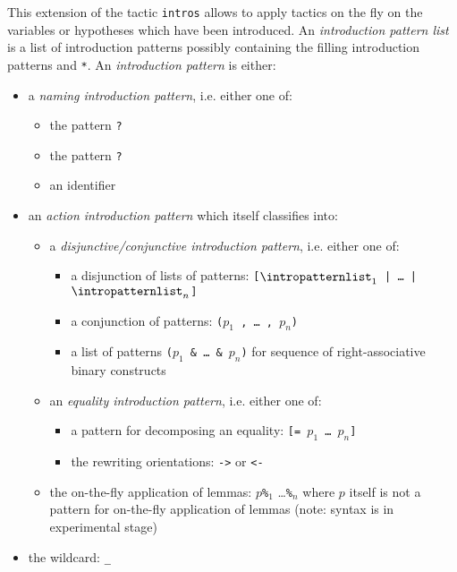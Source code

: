 This extension of the tactic {\tt intros} allows to apply tactics on
the fly on the variables or hypotheses which have been introduced. An
{\em introduction pattern list} {\intropatternlist} is a list of
introduction patterns possibly containing the filling introduction
patterns {\tt *} and {\tt **}. An {\em introduction pattern} is
either:
\begin{itemize}
\item a {\em naming introduction pattern}, i.e. either one of:
  \begin{itemize}
  \item the pattern \texttt{?}
  \item the pattern \texttt{?\ident}
  \item an identifier
  \end{itemize}
\item an {\em action introduction pattern} which itself classifies into:
  \begin{itemize}
  \item a {\em disjunctive/conjunctive introduction pattern}, i.e. either one of:
    \begin{itemize}
    \item a disjunction of lists of patterns:
      {\tt [$\intropatternlist_1$ | \dots\ | $\intropatternlist_n$]}
    \item a conjunction of patterns: {\tt ($p_1$ , \dots\ , $p_n$)}
    \item a list of patterns {\tt ($p_1$ \&\ \dots\ \&\ $p_n$)}
      for sequence of right-associative binary constructs
    \end{itemize}
  \item an {\em equality introduction pattern}, i.e. either one of:
    \begin{itemize}
    \item a pattern for decomposing an equality: {\tt [= $p_1$ \dots\ $p_n$]}
    \item the rewriting orientations: {\tt ->} or {\tt <-}
    \end{itemize}
  \item the on-the-fly application of lemmas: $p${\tt \%{\term$_1$}}
    \ldots {\tt \%{\term$_n$}} where $p$ itself is not a pattern for
    on-the-fly application of lemmas (note: syntax is in experimental stage)
  \end{itemize}
\item the wildcard: {\tt \_}
\end{itemize}

